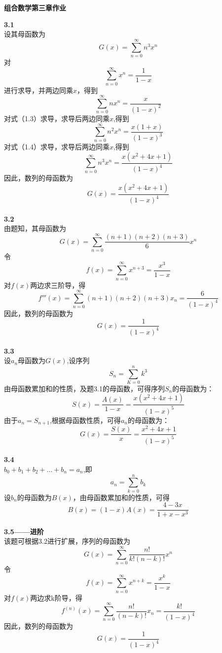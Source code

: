 \documentclass[a4paper,12pt]{article}
\begin{document}
	
	\begin{center}
		{\large \textbf{组合数学第三章作业}}\\
		
	\end{center}
	
	\noindent
	\textbf{3.1}\\
	设其母函数为
	\[
		G(x)=\sum_{n=0}^{\infty}{n^{3}x^{n}} \tag{1.1}
	\]
	对
	\[
		\sum_{n=0}^{\infty}{x^{n}}=\frac{1}{1-x} \tag{1.2}
	\]
	进行求导，并两边同乘$x$，得到
	\[
		\sum_{n=0}^{\infty}{nx^{n}}=\frac{x}{(1-x)^{2}} \tag{1.3}
	\]
	对式（1.3）求导，求导后两边同乘$x$,得到
	\[
		\sum_{n=0}^{\infty}{n^{2}x^{n}}=\frac{x(1+x)}{(1-x)^{3}} \tag{1.4}
	\]
	对式（1.4）求导，求导后两边同乘$x$,得到
	\[
		\sum_{n=0}^{\infty}{n^{3}x^{n}}=\frac{x(x^{2}+4x+1)}{(1-x)^{4}} \tag{1.5}
	\]
	因此，数列的母函数为
	\[
		G(x)=\frac{x(x^{2}+4x+1)}{(1-x)^{4}}
	\]
	\\
	
	\noindent
	\textbf{3.2}\\
	由题知，其母函数为
	\[
		G(x)=\sum_{n=0}^{\infty}{\frac{(n+1)(n+2)(n+3)}{6}x^{n}} \tag{2.1}
	\]
	令
	\[
		f(x)=\sum_{n=0}^{\infty}{x^{n+3}}=\frac{x^{3}}{1-x} \tag{2.2}
	\]
	对$f(x)$两边求三阶导，得
	\[
		f'''(x)=\sum_{n=0}^{\infty}{(n+1)(n+2)(n+3)x_{n}}=\frac{6}{(1-x)^{4}}
	\]
	因此，数列的母函数为
	\[
		G(x)=\frac{1}{(1-x)^{4}}
	\]
	\\
	
	\noindent
	\textbf{3.3}\\
	设$a_{n}$母函数为$G(x)$,设序列
	\[
		S_{n}=\sum_{K=0}^{n}{k^{3}}
	\]
	由母函数累加和的性质，及题3.1的母函数，可得序列$S_{n}$的母函数为：
	\[
		S(x)=\frac{A(x)}{1-x}=\frac{x(x^{2}+4x+1)}{(1-x)^{5}}
	\]
	由于$a_{n}=S_{n+1}$,根据母函数性质，可得$a_{n}$的母函数为：
	\[
		G(x)=\frac{S(x)}{x}=\frac{x^{2}+4x+1}{(1-x)^{5}}
	\]
	\\
	
	\noindent
	\textbf{3.4}\\
	$b_{0}+b_{1}+b_{2}+\dots+b_{n}=a_{n}$,即
	\[
		a_{n}=\sum_{k=0}^{n}{b_{k}}
	\]
	设$b_{n}$的母函数为$B(x)$，由母函数累加和的性质，可得
	\[
		B(x)=(1-x)A(x)=\frac{4-3x}{1+x-x^3}
	\]
	\\
	
	\noindent
	\textbf{3.5——进阶}\\
	该题可根据3.2进行扩展，序列的母函数为
	\[
		G(x)=\sum_{n=0}^{\infty}{\frac{n!}{k!(n-k)!}x^{n}} \tag{2.1}
	\]
	令
	\[
		f(x)=\sum_{n=0}^{\infty}{x^{n+k}}=\frac{x^{k}}{1-x} \tag{2.2}
	\]
	对$f(x)$两边求k阶导，得
	\[
		f^{(n)}(x)=\sum_{n=0}^{\infty}{\frac{n!}{(n-k)!}x_{n}}=\frac{k!}{(1-x)^{4}}
	\]
	因此，数列的母函数为
	\[
		G(x)=\frac{1}{(1-x)^{4}}
	\]
	\\
	
\end{document}
